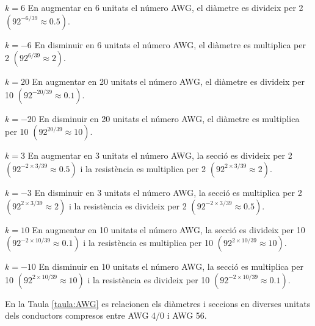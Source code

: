 \begin{list}{}
   {\setlength{\labelwidth}{15mm} \setlength{\leftmargin}{17mm} \setlength{\labelsep}{2mm}}

   \item[$k=6$\hfill] En augmentar en 6  unitats el n\'{u}mero AWG, el di\`{a}metre es divideix per 2
                 $(92^{-6/39}\approx \num{0,5})$.

   \item[$k=-6$\hfill] En disminuir en 6 unitats el n\'{u}mero AWG, el di\`{a}metre es multiplica per 2
                 $(92^{6/39}\approx 2)$.

   \item[$k=20$\hfill] En augmentar en 20  unitats el n\'{u}mero AWG, el di\`{a}metre es divideix per 10
                 $(92^{-20/39}\approx \num{0,1})$.

   \item[$k=-20$\hfill] En disminuir en 20 unitats el n\'{u}mero AWG, el di\`{a}metre es multiplica per 10
                 $(92^{20/39}\approx 10)$.

   \item[$k=3$\hfill] En augmentar en 3 unitats el n\'{u}mero AWG, la secci\'{o} es divideix per 2
                 $(92^{-2\times 3/39}\approx \num{0,5})$ i la resist\`{e}ncia es multiplica per 2
                 $(92^{2\times 3/39}\approx 2)$.

   \item[$k=-3$\hfill] En disminuir en 3 unitats el n\'{u}mero AWG, la secci\'{o} es multiplica per 2
                  $(92^{2\times 3/39}\approx 2)$ i la resist\`{e}ncia es divideix per 2
                  $(92^{-2\times 3/39}\approx \num{0,5})$.

   \item[$k=10$\hfill] En augmentar en 10 unitats el n\'{u}mero AWG, la secci\'{o} es divideix per 10
                 $(92^{-2\times 10/39}\approx \num{0,1})$ i la resist\`{e}ncia es multiplica per 10
                 $(92^{2\times 10/39}\approx 10)$.

   \item[$k=-10$\hfill] En disminuir en 10 unitats el n\'{u}mero AWG, la secci\'{o} es multiplica per 10
                  $(92^{2\times 10/39}\approx 10)$ i la resist\`{e}ncia es divideix per 10
                  $(92^{-2\times 10/39}\approx \num{0,1})$.
\end{list}

En la Taula \vref{taula:AWG} es relacionen els di\`{a}metres i seccions en diverses unitats dels conductors compresos entre AWG 4/0 i AWG 56.



